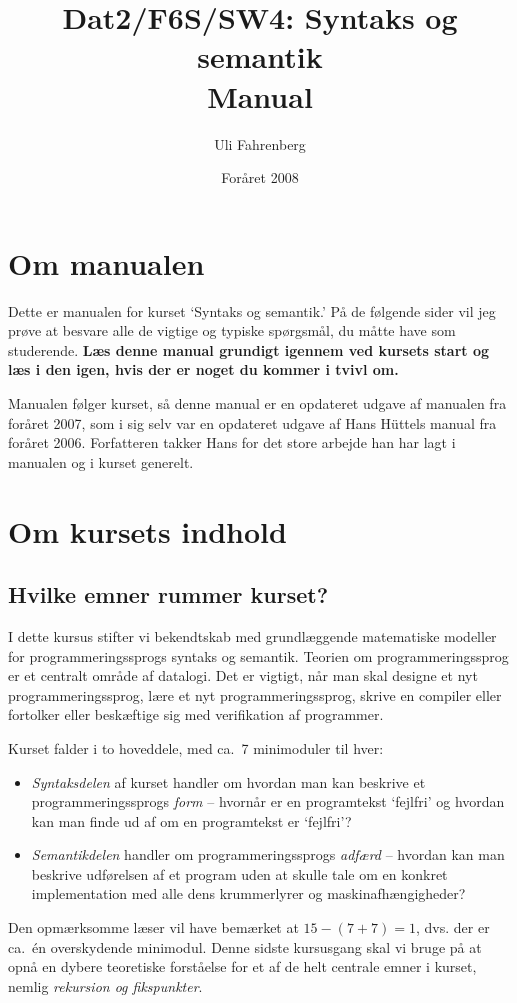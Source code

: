 \documentclass[11pt,a4paper,article,oneside]{memoir}
\title{Dat2/F6S/SW4: Syntaks og semantik\\ Manual}
\author{Uli Fahrenberg}
\date{Foråret 2008}
\begin{document}
\begin{titlingpage}

\maketitle

\tableofcontents
\end{titlingpage}

\chapter{Om manualen}
 
Dette er manualen for kurset `Syntaks og semantik.' På de følgende sider
vil jeg prøve at besvare alle de vigtige og typiske spørgsmål, du måtte
have som studerende.  \textbf{Læs denne manual grundigt igennem ved
  kursets start og læs i den igen, hvis der er noget du kommer i tvivl
  om.}

Manualen følger kurset, så denne manual er en opdateret udgave af
manualen fra foråret 2007, som i sig selv var en opdateret udgave af
Hans Hüttels manual fra foråret 2006. Forfatteren takker Hans for det
store arbejde han har lagt i manualen og i kurset generelt.
    
\chapter{Om kursets indhold}

\section{Hvilke emner rummer kurset?}

I dette kursus stifter vi bekendtskab med grundlæggende matematiske
modeller for programmeringssprogs syntaks og semantik. Teorien om
programmeringssprog er et centralt område af datalogi. Det er vigtigt, når
man skal designe et nyt programmeringssprog, lære et nyt
programmeringssprog, skrive en compiler eller fortolker eller beskæftige
sig med verifikation af programmer.

Kurset falder i to hoveddele, med ca.\ 7 minimoduler til hver:
\begin{itemize}
\item \emph{Syntaksdelen} af kurset handler om hvordan man kan beskrive et
  programmeringssprogs \emph{form} -- hvornår er en programtekst `fejlfri'
  og hvordan kan man finde ud af om en programtekst er `fejlfri'?
\item \emph{Semantikdelen} handler om programmeringssprogs \emph{adfærd}
  -- hvordan kan man beskrive udførelsen af et program uden at skulle tale
  om en konkret implementation med alle dens krummerlyrer og
  maskinafhængigheder?
\end{itemize}
Den opmærksomme læser vil have bemærket at $15- (7+ 7)= 1$, dvs. der
er ca.\ én overskydende minimodul. Denne sidste kursusgang skal vi
bruge på at opnå en dybere teoretiske forståelse for et af de helt
centrale emner i kurset, nemlig \emph{rekursion og fikspunkter}.
\end{document}
